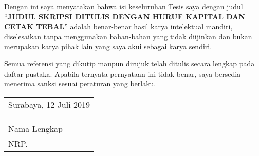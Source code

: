 \begin{spacing}{1.5}

Dengan ini saya menyatakan bahwa isi keseluruhan Tesis saya dengan judul “\textbf{JUDUL SKRIPSI DITULIS DENGAN HURUF KAPITAL DAN CETAK TEBAL}” adalah benar-benar hasil karya intelektual mandiri, diselesaikan tanpa menggunakan bahan-bahan yang tidak diijinkan dan bukan merupakan karya pihak lain yang saya akui sebagai karya sendiri.

Semua referensi yang dikutip maupun dirujuk telah ditulis secara lengkap pada daftar pustaka. Apabila ternyata pernyataan ini tidak benar, saya bersedia menerima sanksi sesuai peraturan yang berlaku.

\vspace{1ex}

\end{spacing}
\begin{flushright}
\begin{tabular}[b]{l}
    Surabaya, 12 Juli 2019 \\
    \\
    \\
    \\
    Nama Lengkap\\
    NRP.
\end{tabular}
\end{flushright}